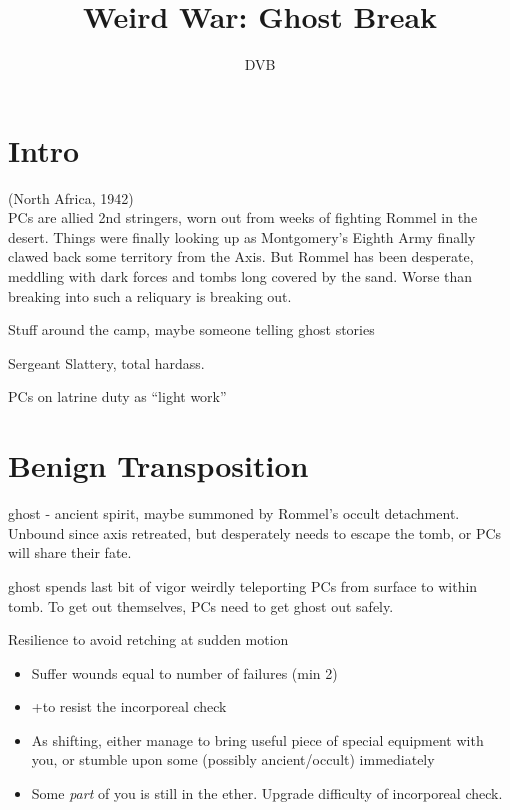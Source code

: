 \documentclass[background]{book}
\title{Weird War: Ghost Break}
\author{DVB}
\newcommand{\df}{\DifficultyDie}
\newcommand{\bbb}{\BoostDie}
\begin{document}
\maketitle

\begin{multicols}{2}
\section{Intro}
(North Africa, 1942)\\

PCs are allied 2nd stringers, worn out from weeks of fighting Rommel in the desert.  Things were finally looking up as Montgomery's Eighth Army finally clawed back some territory from the Axis.  But Rommel has been desperate, meddling with dark forces and tombs long covered by the sand.  Worse than breaking into such a reliquary is breaking out\cdots.

Stuff around the camp, maybe someone telling ghost stories

Sergeant Slattery, total hardass.

PCs on latrine duty as ``light work''

\section{Benign Transposition}

ghost - ancient spirit, maybe summoned by Rommel's occult detachment.  Unbound since axis retreated, but desperately needs to escape the tomb, or PCs will share their fate.

ghost spends last bit of vigor weirdly teleporting PCs from surface to within tomb.  To get out themselves, PCs need to get ghost out safely.

\df\df\df Resilience to avoid retching at sudden motion
    \begin{itemize}
        \item \Failure Suffer wounds equal to number of failures (min 2)
        \item \Advantage +\bbb to resist the incorporeal check
        \item \Triumph As shifting, either manage to bring useful piece of special equipment with you, or stumble upon some (possibly ancient/occult) immediately
        \item \Despair Some \emph{part} of you is still in the ether.  Upgrade difficulty of incorporeal check.
    \end{itemize}



\end{multicols}
\end{document}
